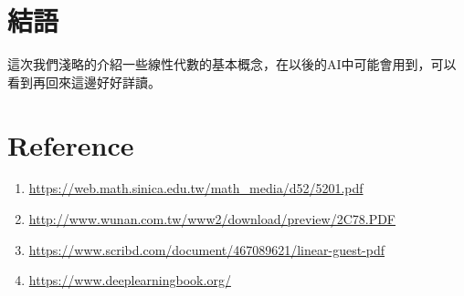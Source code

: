 \documentclass[11pt]{article}
\begin{document}
\section{結語}
這次我們淺略的介紹一些線性代數的基本概念，在以後的AI中可能會用到，可以看到再回來這邊好好詳讀。
\pagebreak
\section{Reference}
\begin{enumerate}
    \item \url{https://web.math.sinica.edu.tw/math\_media/d52/5201.pdf}
    \item \url{http://www.wunan.com.tw/www2/download/preview/2C78.PDF}
    \item \url{https://www.scribd.com/document/467089621/linear-guest-pdf}
    \item \url{https://www.deeplearningbook.org/}
\end{enumerate}
\end{document}
